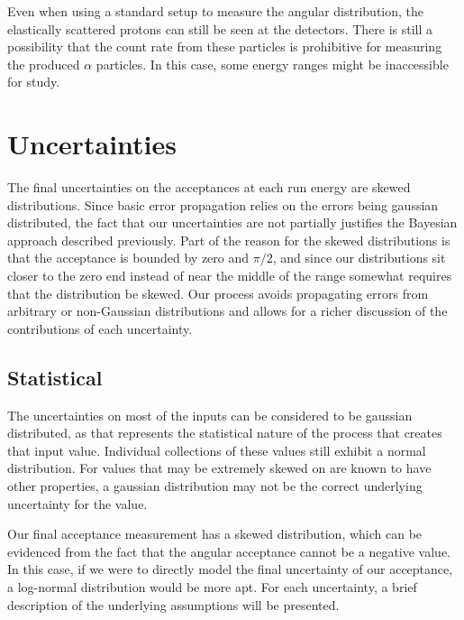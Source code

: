 Even when using a standard setup to measure the angular distribution,
the elastically scattered protons can still be seen at the detectors.
There is still a possibility that the count rate from these particles is
prohibitive for measuring the produced $\alpha$ particles. In this case,
some energy ranges might be inaccessible for study.


\section{Uncertainties}
\label{sec:uncertainties}

The final uncertainties on the acceptances at each run energy are skewed
distributions. Since basic error propagation relies on the errors being
gaussian distributed, the fact that our uncertainties are not partially
justifies the Bayesian approach described previously. Part of the reason
for the skewed distributions is that the acceptance is bounded by zero
and $\pi/2$, and since our distributions sit closer to the zero end
instead of near the middle of the range somewhat requires that the
distribution be skewed. Our process avoids propagating errors from
arbitrary or non-Gaussian distributions and allows for a richer
discussion of the contributions of each uncertainty.

\subsection{Statistical}

The uncertainties on most of the inputs can be considered to be gaussian
distributed, as that represents the statistical nature of the process
that creates that input value. Individual collections of these values
still exhibit a normal distribution. For values that may be extremely
skewed on are known to have other properties, a gaussian distribution
may not be the correct underlying uncertainty for the value.

Our final acceptance measurement has a skewed distribution, which can be
evidenced from the fact that the angular acceptance cannot be a negative
value. In this case, if we were to directly model the final uncertainty
of our acceptance, a log-normal distribution would be more apt. For each
uncertainty, a brief description of the underlying assumptions will be
presented.

